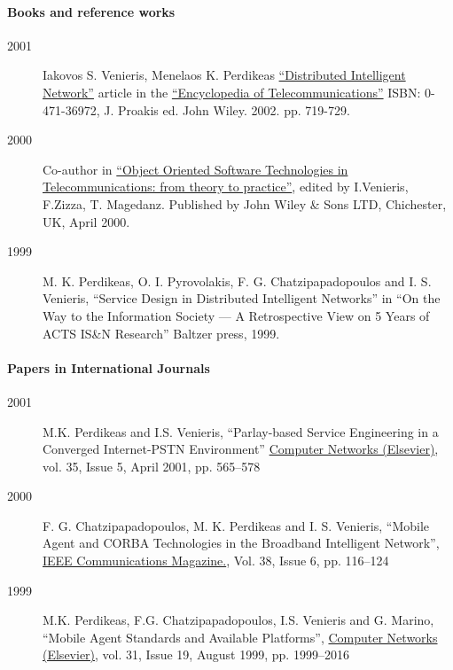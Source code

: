 \documentclass[10pt,a4paper]{article} %
\begin{document}

\paragraph{Books and reference works}

  \begin{description}
  \item[2001] Iakovos S. Venieris, Menelaos K. Perdikeas
    \href{http://onlinelibrary.wiley.com/doi/10.1002/0471219282.eot257/full}{``Distributed Intelligent Network''} article in the
    \href{http://eu.wiley.com/WileyCDA/WileyTitle/productCd-0471369721.html}{``Encyclopedia of Telecommunications''} ISBN: 0-471-36972, J. Proakis ed. John Wiley. 2002. pp. 719-729.
  \item[2000] Co-author in \href{http://eu.wiley.com/WileyCDA/WileyTitle/productCd-0471623792.html}{``Object Oriented Software Technologies in Telecommunications: from theory to practice''}, edited by I.Venieris, F.Zizza, T. Magedanz. Published by John Wiley \& Sons LTD, Chichester, UK, April 2000.
  \item[1999] M. K. Perdikeas, O. I. Pyrovolakis, F. G. Chatzipapadopoulos and I. S. Venieris, ``Service Design in Distributed Intelligent Networks'' in ``On the Way to the Information Society --- A Retrospective View on 5 Years of ACTS IS\&N Research'' Baltzer press, 1999.
  \end{description}
  \paragraph{Papers in International Journals}
  \begin{description}
  \item[2001] M.K. Perdikeas and I.S. Venieris,  ``Parlay-based Service Engineering in a Converged Internet-PSTN Environment'' \href{http://www.sciencedirect.com/science/journal/13891286}{Computer Networks (Elsevier)},
    vol. 35, Issue 5, April 2001, pp. 565--578
  \item[2000]F. G. Chatzipapadopoulos, M. K. Perdikeas and I. S. Venieris, ``Mobile Agent and CORBA Technologies in the Broadband Intelligent Network'', \href{http://www.comsoc.org/commag}{IEEE Communications Magazine.}, Vol. 38, Issue 6, pp. 116--124
    \item[1999] M.K. Perdikeas, F.G. Chatzipapadopoulos, I.S. Venieris and G. Marino, ``Mobile Agent Standards and Available Platforms'', \href{http://www.sciencedirect.com/science/journal/13891286}{Computer Networks (Elsevier)}, vol. 31, Issue 19, August 1999, pp. 1999--2016
  \end{description}
\end{document}
